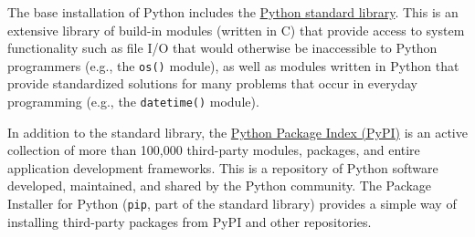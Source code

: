 \documentclass{UNB-Physics-Assignment}
\begin{document}
\maketitle


\noindent
The base installation of Python includes the \href{https://docs.python.org/3.12/library/index.html}{Python standard library}. This is an extensive library of build-in modules (written in C) that provide access to system functionality such as file I/O that would otherwise be inaccessible to Python programmers (e.g., the \verb"os()" module), as well as modules written in Python that provide standardized solutions for many problems that occur in everyday programming (e.g., the \verb"datetime()" module).

In addition to the standard library, the \href{https://pypi.org/}{Python Package Index (PyPI)} is an active collection of more than 100,000 third-party modules, packages, and entire application development frameworks. This is a repository of Python software developed, maintained, and shared by the Python community. The Package Installer for Python (\verb"pip", part of the standard library) provides a simple way of installing third-party packages from PyPI and other repositories.
\end{document}

